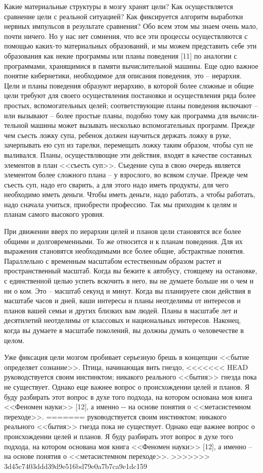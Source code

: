 \documentclass{book}
\begin{document}
Какие материальные структуры в мозгу хранят цели? Как осуществляется сравнение цели с реальной ситуацией? Как фиксируется 
алгоритм выработки нервных импульсов в результате сравнения? Обо всем этом мы знаем очень мало, почти ничего. Но у нас нет 
сомнения, что все эти процессы осуществляются с помощью каких-то материальных образований, и мы можем представить себе эти 
образования как некие програм­мы или планы  поведения [11] по аналогии с программами, хра­нящимися в памяти вычислительной машины.
Еще одно важное понятие кибернетики, необходимое для описания поведения, это -- иерархия.  Цели и планы поведения образуют 
иерархию, в которой более сложные и общие цели требуют для своего осуществления постановки и осуществле­ния ряда более простых, 
вспомогательных целей; соответству­ющие планы поведения включают -- или вызывают -- более простые планы, подобно тому как 
программа для вычисли­тельной машины может вызывать несколько вспомогательных программ. Прежде чем съесть ложку супа, ребенок 
должен научиться держать ложку в руке, зачерпывать ею суп из тарел­ки, перемещать ложку таким образом, чтобы суп не выливался. 
Планы, осуществляющие эти действия, входят в качестве состав­ных элементов в план <<съесть суп>>. Съедение супа в свою оче­редь 
является элементом более сложного плана -- у взрослого, во всяком случае. Прежде чем съесть суп, надо его сварить, а для этого 
надо иметь продукты, для чего необходимо иметь деньги. Чтобы иметь деньги, надо работать, а чтобы работать, надо сначала 
учиться, приобрести профессию. Так мы приходим к целям и планам самого высокого уровня.

При движении вверх по иерархии целей и планов цели становятся все более общими и долговременными. То же относится и к планам 
поведения. Для их выражения становятся необходимыми все более общие, абстрактные понятия. Параллельно с временным масштабом 
естественным образом растет и пространственный масштаб. Когда вы бежите к автобусу, стоящему на остановке, с единственной целью 
успеть вскочить в него, вы не думаете больше ни о чем и ни о ком. Это -- масштаб секунд и минут. Когда вы планируете свои 
действия в масштабе часов и дней, ваши интересы и планы неотделимы от инте­ресов и планов вашей семьи и других близких вам людей. 
Пла­ны в масштабе лет и десятилетий неотделимы от классовых и национальных интересов. Наконец, когда вы думаете в масш­табе 
поколений, вы должны думать о человечестве в целом.

Уже фиксация цели мозгом пробивает серьезную брешь в концепции <<бытие определяет сознание>>. Птица, начинающая вить гнездо, 
<<<<<<< HEAD
руководствуется своим инстинктом; никакого реального <<бытия>> гнезда пока не существует. Однако еще важнее вопрос о происхождении 
целей и планов. Я буду раз­бирать этот вопрос в духе того подхода, на котором основана моя книга <<Феномен науки>> [12], а именно 
-‑ на основе понятия о <<метасистемном переходе>>.
=======
руководствуется своим инстинктом; никакого реального <<бытия>> гнезда пока не существует. Однако еще важнее вопрос о происхождении целей и планов. Я буду раз­бирать этот вопрос в духе того подхода, на котором основана моя книга <<Феномен науки>> [12], а именно -- на основе понятия о <<метасистемном переходе>>.
>>>>>>> 3d45c7403ddd39d9e516bd79e0a7b7ca9e1dc159
\end{document}
